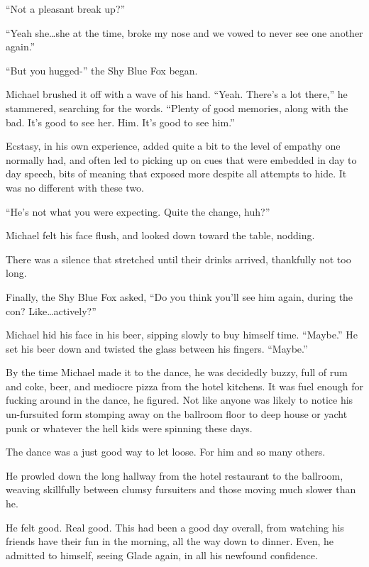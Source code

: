 ``Not a pleasant break up?''

``Yeah she\ldots{}she at the time, broke my nose and we vowed to never see one another again.''

``But you hugged-'' the Shy Blue Fox began.

Michael brushed it off with a wave of his hand. ``Yeah. There's a lot there,'' he stammered, searching for the words. ``Plenty of good memories, along with the bad. It's good to see her. Him. It's good to see him.''

Ecstasy, in his own experience, added quite a bit to the level of empathy one normally had, and often led to picking up on cues that were embedded in day to day speech, bits of meaning that exposed more despite all attempts to hide. It was no different with these two.

``He's not what you were expecting. Quite the change, huh?''

Michael felt his face flush, and looked down toward the table, nodding.

There was a silence that stretched until their drinks arrived, thankfully not too long.

Finally, the Shy Blue Fox asked, ``Do you think you'll see him again, during the con? Like\ldots{}actively?''

Michael hid his face in his beer, sipping slowly to buy himself time. ``Maybe.'' He set his beer down and twisted the glass between his fingers. ``Maybe.''

\secdiv{}

By the time Michael made it to the dance, he was decidedly buzzy, full of rum and coke, beer, and mediocre pizza from the hotel kitchens. It was fuel enough for fucking around in the dance, he figured. Not like anyone was likely to notice his un-fursuited form stomping away on the ballroom floor to deep house or yacht punk or whatever the hell kids were spinning these days.

The dance was a just good way to let loose. For him and so many others.

He prowled down the long hallway from the hotel restaurant to the ballroom, weaving skillfully between clumsy fursuiters and those moving much slower than he.

He felt good. Real good. This had been a good day overall, from watching his friends have their fun in the morning, all the way down to dinner. Even, he admitted to himself, seeing Glade again, in all his newfound confidence.

